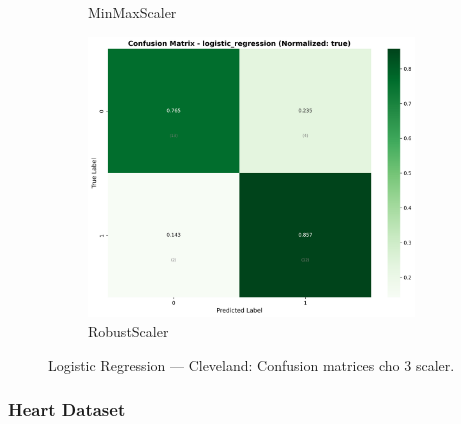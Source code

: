 \begin{figure}[H]
\begin{subfigure}[b]{0.31\textwidth}
\caption{MinMaxScaler}\label{fig:logreg_clev_cm_minmax}
\end{subfigure}\hfill
\begin{subfigure}[b]{0.31\textwidth}\centering
\includegraphics[width=0.95\textwidth]{Result/cleveland_dataset/confusion_matrices/logistic_regression_numeric_dataset_RobustScaler.png}
\caption{RobustScaler}\label{fig:logreg_clev_cm_robust}
\end{subfigure}
\caption{Logistic Regression — Cleveland: Confusion matrices cho 3 scaler.}
\label{fig:logreg_clev_confusions}
\end{figure}

\FloatBarrier

\subsubsection{Heart Dataset}\label{subsubsec:logreg-heart}

